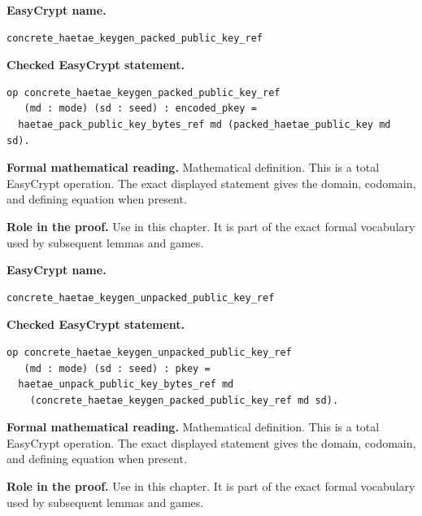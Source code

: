 \begin{formaldefinition}
\noindent\textbf{EasyCrypt name.}
\begin{lstlisting}[language=EasyCrypt,basicstyle=\ttfamily\scriptsize]
concrete_haetae_keygen_packed_public_key_ref
\end{lstlisting}
\noindent\textbf{Checked EasyCrypt statement.}
\begin{lstlisting}[language=EasyCrypt,basicstyle=\ttfamily\scriptsize]
op concrete_haetae_keygen_packed_public_key_ref
   (md : mode) (sd : seed) : encoded_pkey =
  haetae_pack_public_key_bytes_ref md (packed_haetae_public_key md sd).
\end{lstlisting}
\noindent\textbf{Formal mathematical reading.}
Mathematical definition. This is a total EasyCrypt operation.  The exact displayed statement gives the domain, codomain, and defining equation when present.

\noindent\textbf{Role in the proof.}
Use in this chapter. It is part of the exact formal vocabulary used by subsequent lemmas and games.

\end{formaldefinition}

\begin{formaldefinition}
\noindent\textbf{EasyCrypt name.}
\begin{lstlisting}[language=EasyCrypt,basicstyle=\ttfamily\scriptsize]
concrete_haetae_keygen_unpacked_public_key_ref
\end{lstlisting}
\noindent\textbf{Checked EasyCrypt statement.}
\begin{lstlisting}[language=EasyCrypt,basicstyle=\ttfamily\scriptsize]
op concrete_haetae_keygen_unpacked_public_key_ref
   (md : mode) (sd : seed) : pkey =
  haetae_unpack_public_key_bytes_ref md
    (concrete_haetae_keygen_packed_public_key_ref md sd).
\end{lstlisting}
\noindent\textbf{Formal mathematical reading.}
Mathematical definition. This is a total EasyCrypt operation.  The exact displayed statement gives the domain, codomain, and defining equation when present.

\noindent\textbf{Role in the proof.}
Use in this chapter. It is part of the exact formal vocabulary used by subsequent lemmas and games.

\end{formaldefinition}

